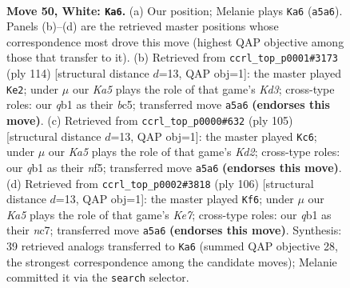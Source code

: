 \documentclass[11pt]{article}
\begin{document}
\clearpage

\begin{figure}[p]\centering
\begin{subfigure}{0.46\textwidth}\centering
\resizebox{\linewidth}{!}{%
\newchessgame
\chessboard[
  setfen={7k/3q4/8/K7/2p2P2/2P5/8/1q6 w - - 0 50},
  showmover=false,
  pgfstyle=straightmove, color=movearrow, markmove={a5-a6}
]}
\caption{}
\end{subfigure}\hfill
\begin{subfigure}{0.46\textwidth}\centering
\resizebox{\linewidth}{!}{%
\newchessgame
\chessboard[
  setfen={8/8/7p/P1b2k2/7P/3K4/8/8 w - - 1 58},
  showmover=false,
  pgfstyle=straightmove, color=movearrow, markmove={d3-e2}
]}
\caption{}
\end{subfigure}
\\[4pt]
\begin{subfigure}{0.46\textwidth}\centering
\resizebox{\linewidth}{!}{%
\newchessgame
\chessboard[
  setfen={8/3k4/p7/P4N2/6p1/8/8/6K1 b - - 1 53},
  showmover=false,
  pgfstyle=straightmove, color=movearrow, markmove={d7-c6}
]}
\caption{}
\end{subfigure}\hfill
\begin{subfigure}{0.46\textwidth}\centering
\resizebox{\linewidth}{!}{%
\newchessgame
\chessboard[
  setfen={8/P1n1K3/7p/7P/4k3/8/8/8 w - - 0 54},
  showmover=false,
  pgfstyle=straightmove, color=movearrow, markmove={e7-f6}
]}
\caption{}
\end{subfigure}
\caption{\textbf{Move 50, White: \texttt{Ka6}.} (a) Our position; Melanie plays \texttt{Ka6} (\texttt{a5a6}). Panels (b)--(d) are the retrieved master positions whose correspondence most drove this move (highest QAP objective among those that transfer to it). (b) Retrieved from \texttt{ccrl\_top\_p0001\#3173} (ply 114) [structural distance $d$=13, QAP obj=1]: the master played \texttt{Ke2}; under $\mu$ our \emph{Ka5} plays the role of that game's \emph{Kd3}; cross-type roles: our \emph{q}b1 as their \emph{b}c5; transferred move \texttt{a5a6} \textbf{(endorses this move)}. (c) Retrieved from \texttt{ccrl\_top\_p0000\#632} (ply 105) [structural distance $d$=13, QAP obj=1]: the master played \texttt{Kc6}; under $\mu$ our \emph{Ka5} plays the role of that game's \emph{Kd2}; cross-type roles: our \emph{q}b1 as their \emph{n}f5; transferred move \texttt{a5a6} \textbf{(endorses this move)}. (d) Retrieved from \texttt{ccrl\_top\_p0002\#3818} (ply 106) [structural distance $d$=13, QAP obj=1]: the master played \texttt{Kf6}; under $\mu$ our \emph{Ka5} plays the role of that game's \emph{Ke7}; cross-type roles: our \emph{q}b1 as their \emph{n}c7; transferred move \texttt{a5a6} \textbf{(endorses this move)}. Synthesis: 39 retrieved analogs transferred to \texttt{Ka6} (summed QAP objective 28, the strongest correspondence among the candidate moves); Melanie committed it via the \texttt{search} selector.}
\label{fig:thought-m98}
\end{figure}
\end{document}
